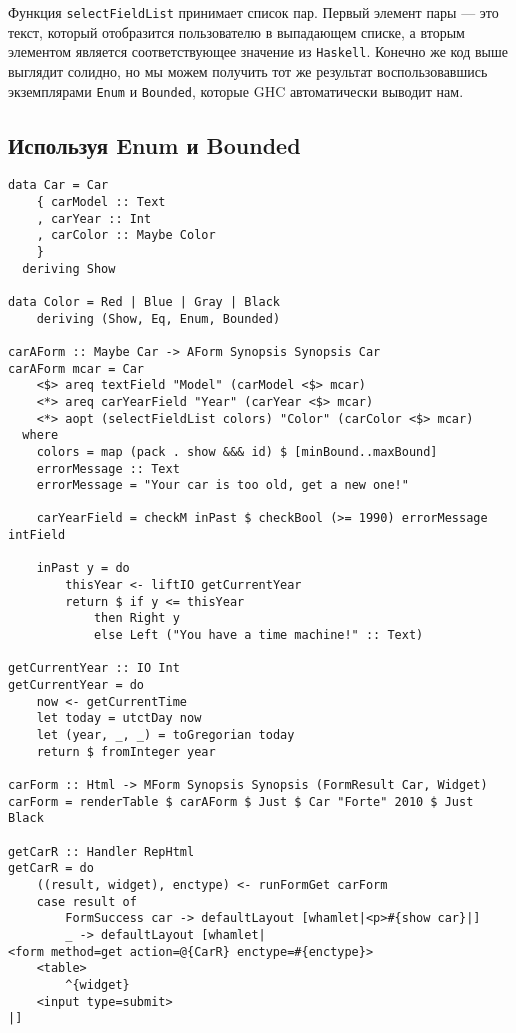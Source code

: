 Функция \lstinline'selectFieldList' принимает список пар. Первый элемент пары --- это
текст, который отобразится пользователю в выпадающем списке, а вторым элементом
является соответствующее значение из \lstinline'Haskell'. Конечно же код выше выглядит
солидно, но мы можем получить тот же результат воспользовавшись экземплярами
\lstinline'Enum' и \lstinline'Bounded', которые GHC автоматически
выводит нам.

\subsection{Используя Enum и Bounded}

\begin{lstlisting}
data Car = Car
    { carModel :: Text
    , carYear :: Int
    , carColor :: Maybe Color
    }
  deriving Show

data Color = Red | Blue | Gray | Black
    deriving (Show, Eq, Enum, Bounded)

carAForm :: Maybe Car -> AForm Synopsis Synopsis Car
carAForm mcar = Car
    <$> areq textField "Model" (carModel <$> mcar)
    <*> areq carYearField "Year" (carYear <$> mcar)
    <*> aopt (selectFieldList colors) "Color" (carColor <$> mcar)
  where
    colors = map (pack . show &&& id) $ [minBound..maxBound]
    errorMessage :: Text
    errorMessage = "Your car is too old, get a new one!"

    carYearField = checkM inPast $ checkBool (>= 1990) errorMessage intField

    inPast y = do
        thisYear <- liftIO getCurrentYear
        return $ if y <= thisYear
            then Right y
            else Left ("You have a time machine!" :: Text)

getCurrentYear :: IO Int
getCurrentYear = do
    now <- getCurrentTime
    let today = utctDay now
    let (year, _, _) = toGregorian today
    return $ fromInteger year

carForm :: Html -> MForm Synopsis Synopsis (FormResult Car, Widget)
carForm = renderTable $ carAForm $ Just $ Car "Forte" 2010 $ Just Black

getCarR :: Handler RepHtml
getCarR = do
    ((result, widget), enctype) <- runFormGet carForm
    case result of
        FormSuccess car -> defaultLayout [whamlet|<p>#{show car}|]
        _ -> defaultLayout [whamlet|
<form method=get action=@{CarR} enctype=#{enctype}>
    <table>
        ^{widget}
    <input type=submit>
|]
\end{lstlisting}

